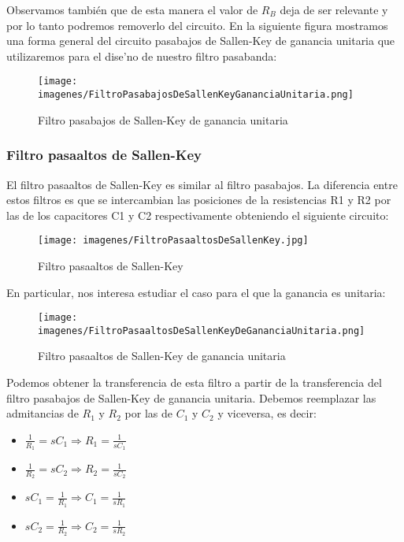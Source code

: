 \documentclass[12pt, titlepage]{article}
\begin{document}
    Observamos también que de esta manera el valor de $R_B$ deja de ser relevante y por lo tanto podremos removerlo del circuito. En la siguiente figura mostramos una forma general del circuito pasabajos de Sallen-Key de ganancia unitaria que utilizaremos para el dise'no de nuestro filtro pasabanda:
    
     \begin{figure}[!htb]
    \texttt{[image: imagenes/FiltroPasabajosDeSallenKeyGananciaUnitaria.png]}
    \centering
    \caption{Filtro pasabajos de Sallen-Key de ganancia unitaria}
    \end{figure}
    
    \newpage
    
    \subsubsection{Filtro pasaaltos de Sallen-Key}
    El filtro pasaaltos de Sallen-Key es similar al filtro pasabajos. La diferencia entre estos filtros es que se intercambian las posiciones de la resistencias R1 y R2 por las de los capacitores C1 y C2 respectivamente obteniendo el siguiente circuito:
    \vspace{2mm}
    \begin{figure}[!htb]
    \texttt{[image: imagenes/FiltroPasaaltosDeSallenKey.jpg]}
    \centering
    \caption{Filtro pasaaltos de Sallen-Key}
    \end{figure}
    
    En particular, nos interesa estudiar el caso para el que la ganancia es unitaria: 
    \vspace{2mm}
    \begin{figure}[!htb]
    \texttt{[image: imagenes/FiltroPasaaltosDeSallenKeyDeGananciaUnitaria.png]}
    \centering
    \caption{Filtro pasaaltos de Sallen-Key de ganancia unitaria}
    \end{figure}
    
    Podemos obtener la transferencia de esta filtro a partir de la transferencia del filtro pasabajos de Sallen-Key de ganancia unitaria. Debemos reemplazar las admitancias de $R_1$ y $R_2$ por las de $C_1$ y $C_2$ y viceversa, es decir:
    
   \begin{itemize}
       \item $\frac{1}{R_1} = sC_1 \Rightarrow R_1 = \frac{1}{sC_1}$
       \item $\frac{1}{R_2} = sC_2 \Rightarrow R_2 = \frac{1}{sC_2}$
       \item $sC_1 = \frac{1}{R_1} \Rightarrow C_1 = \frac{1}{sR_1}$
       \item $sC_2 = \frac{1}{R_2}  \Rightarrow C_2 = \frac{1}{sR_2}$
   \end{itemize}
    
\end{document}
